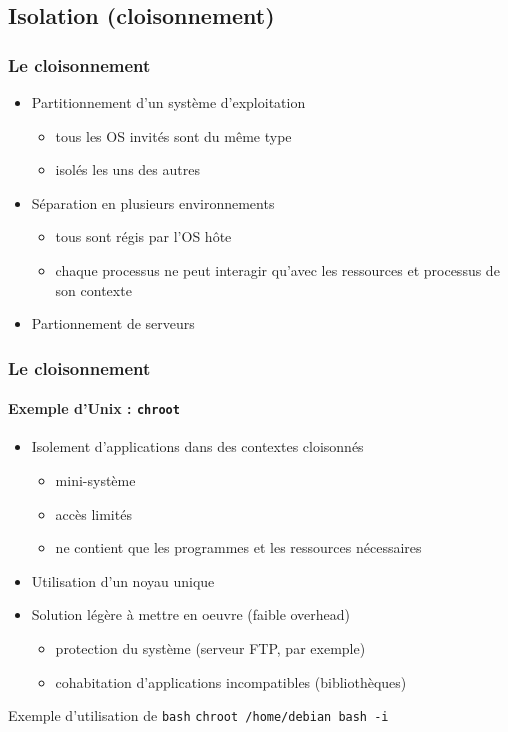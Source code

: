 \subsection{Isolation (cloisonnement)}

\begin{frame}
\frametitle{Le cloisonnement}
\begin{itemize}
\item <1->Partitionnement d’un système d'exploitation
\begin{itemize}
  \item tous les OS invités sont du même type
  \item isolés les uns des autres
\end{itemize}
\item <2->Séparation en plusieurs environnements
\begin{itemize}
\item tous sont régis par l'OS hôte
\item chaque processus ne peut interagir qu'avec les ressources et processus de son contexte
\end{itemize}
\item <3>Partionnement de serveurs
\end{itemize}
\end{frame}

\begin{frame}
\frametitle{Le cloisonnement}
\framesubtitle{Exemple d'Unix : \texttt{chroot}} 
\begin{itemize}
\item Isolement d'applications dans des contextes cloisonnés
\begin{itemize}
\item mini-système
\item accès limités
\item ne contient que les programmes et les ressources nécessaires
\end{itemize}
\item Utilisation d'un noyau unique
\item Solution légère à mettre en oeuvre (faible overhead)
\begin{itemize}
\item protection du système (serveur FTP, par exemple)
\item cohabitation d'applications incompatibles (bibliothèques)
\end{itemize}
\end{itemize}
\begin{exampleblock}{Exemple d'utilisation de \texttt{bash}}
\texttt{chroot /home/debian bash -i}
\end{exampleblock}
\end{frame}

